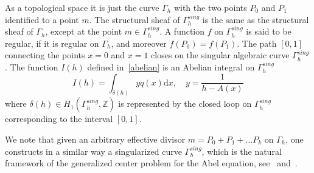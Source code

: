 \documentclass[11pt]{article}
\theoremstyle{definition}
\numberwithin{equation}{section}
\numberwithin{figure}{section}
\numberwithin{table}{section}
\newcommand*{\dd}{\mathrm{d}}
\newcommand*{\dx}{\dd x}
\newcommand*\Z{\mathbb Z}
\begin{document}
As a topological space it is just the curve $\Gamma_h$ with the two points $P_0$ and $P_1$ identified to a point $m$. The structural sheaf of $\Gamma_h^{sing}$ is the same as the structural sheaf of $\Gamma_h$, except at the point $m\in \Gamma_h^{sing}$. A function $f$ on $ \Gamma_h^{sing}$ is said to be regular, if it is regular on $\Gamma_h$, and moreover $f(P_0)=f(P_1)$. The path $[0,1]$ connecting the points $x=0$ and $x=1$ closes on the singular algebraic curve $\Gamma_h^{sing}$. The function $I(h)$ defined in~\eqref{abelian} is an Abelian integral on $\Gamma_h^{sing}$
\[
I(h) = \int_{\delta(h)} y q(x) \dx, \quad y = \frac{1}{h-A(x)}
\]
where $\delta(h) \in H_1(\Gamma_h^{sing},\Z)$ is represented by the closed loop on $\Gamma_h^{sing}$ corresponding to the interval $[0,1]$.

We note that given an arbitrary effective divisor $m=P_0+P_1+ \dots P_k$ on $\Gamma_h$, one constructs in a similar way a singularized curve $\Gamma_h^{sing}$, which is the natural framework of the generalized center problem for the Abel equation, see~\cite[Conjecture~1.7]{bfy99} and~\cite{bry10}.
\end{document}
